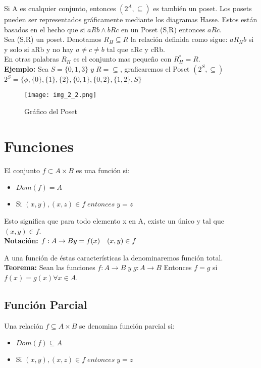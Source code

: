 Si A es cualquier conjunto, entonces $(2^A,\subseteq)$ es también un poset. Los posets pueden ser representados gráficamente mediante los diagramas Hasse. Estos están basados en el hecho que si $aRb \land bRc$ en un Poset (S,R) entonces $aRc$.\\
Sea (S,R) un poset. Denotamos $R_H \subseteq R$ la relación definida como sigue: $aR_H b$ si y solo si aRb y no hay $a\not=c\not=b$ tal que aRc y cRb.\\
En otras palabras $R_H$ es el conjunto mas pequeño con $R_H^*=R$.\\
\textbf{Ejemplo: }Sea $S=\lbrace 0,1,3\rbrace \; y \; R =\subseteq$, graficaremos el Poset $(2^S, \subseteq)$\\
$2^S=\lbrace \phi,\lbrace 0\rbrace,\lbrace 1\rbrace,\lbrace 2\rbrace,\lbrace 0,1\rbrace,\lbrace 0,2\rbrace,\lbrace 1,2\rbrace, S\rbrace$

\begin{figure}
\centering 
\texttt{[image: img\_2\_2.png]}
\caption{Gráfico del Poset}
\end{figure}

\section{Funciones}
El conjunto $f\subset A\times B$ es una función si:
\begin{itemize}
\item $Dom(f)=A$
\item Si $(x,y),(x,z)\in f \; entonces\; y=z$
\end{itemize}
Esto significa que para todo elemento x en A, existe un único y tal que $(x,y)\in f$.\\
\textbf{Notación: } $f:A\rightarrow B\\
					y=f(x)\quad(x,y)\in f$
					
A una función de éstas características la denominaremos función total.\\

\textbf{Teorema: }Sean las funciones $f:A\rightarrow B\; y\; g:A\rightarrow B$ Entonces $f=g$ si $f(x)=g(x) \forall x\in A$.

\subsection{Función Parcial}
Una relación $f\subseteq A\times B$ se denomina función parcial si:
\begin{itemize}
\item $Dom(f)\subseteq A$
\item Si $(x,y),(x,z)\in f\; entonces\; y=z$
\end{itemize}

